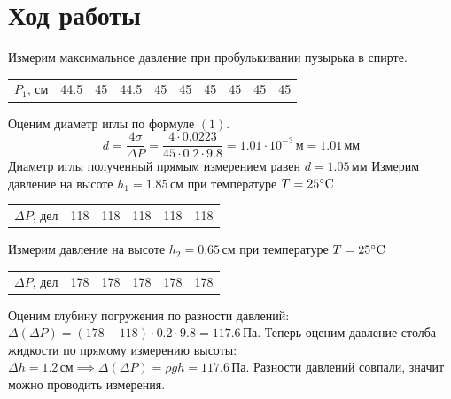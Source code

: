 \documentclass[a4paper,12pt]{article}
\begin{document}
	\section{Ход работы}
		Измерим максимальное давление при пробулькивании пузырька в спирте.
	\begin{center}
		\begin{table}[h]
			\begin{tabular}{|l|l|l|l|l|l|l|l|l|l|}
				$P_1$, см  & 44.5 & 45 & 44.5 & 45 & 45 & 45 & 45 & 45 & 45 \\
			\end{tabular}
		\end{table}
	\end{center}
	Оценим диаметр иглы по формуле $(1)$. 
	\[
	d = \frac{4\sigma}{\Delta P} = \frac{4\cdot0.0223}{45\cdot0.2\cdot 9.8}= 1.01\cdot 10^{-3}\,\text{м} = 1.01\,\text{мм}
	\]
	Диаметр иглы полученный прямым измерением равен $d = 1.05 \,\text{мм}$
	Измерим давление на высоте $h_1 = 1.85 \,\text{см}$ при температуре $T = 25 \celsius$
	\begin{center}
		\begin{table}[h]
			\begin{tabular}{|l|l|l|l|l|l|}
				$\Delta P$, дел & 118 & 118 & 118 & 118 & 118 \\
			\end{tabular}
		\end{table}
	\end{center}
	Измерим давление на высоте $h_2 = 0.65 \,\text{см}$ при температуре $T = 25 \celsius$
	\begin{center}
		\begin{table}[h]
			\begin{tabular}{|l|l|l|l|l|l|}
				$\Delta P$, дел & 178 & 178 & 178 & 178 & 178 \\
			\end{tabular}
		\end{table}
	\end{center}
	Оценим глубину погружения по разности давлений:$\Delta(\Delta P) = (178-118)\cdot0.2\cdot9.8 = 117.6 \,\text{Па}$. Теперь оценим давление столба жидкости по прямому измерению высоты: $\Delta h = 1.2\,\text{см} \implies \Delta(\Delta P) = \rho gh = 117.6 \,\text{Па}$. Разности давлений совпали, значит можно проводить измерения.
	
\end{document}
